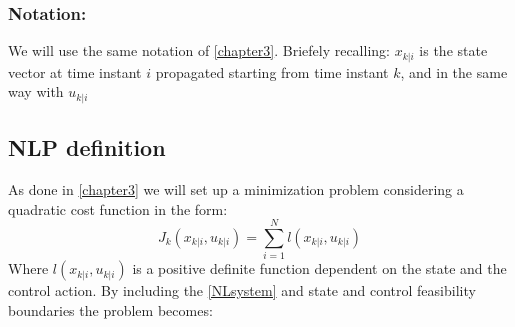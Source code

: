 \subsubsection*{Notation:}
We will use the same notation of \ref{chapter3}. Briefely recalling: ${x}_{k|i}$ is the state vector at time instant $i$ propagated starting from time instant $k$, and in the same way with ${u}_{k|i}$

\subsection{NLP definition}

As done in \ref{chapter3} we will set up a minimization problem considering a quadratic cost function in the form:
\begin{equation}
J_{k}({x}_{k|i},{u}_{k|i})=\sum_{i=1}^{N}l({x}_{k|i},{u}_{k|i})
\end{equation} 
Where $l({x}_{k|i},{u}_{k|i})$ is a positive definite function dependent on the state and the control action. By including the \ref{NLsystem} and state and control feasibility boundaries the problem becomes: 


